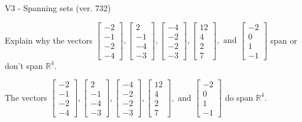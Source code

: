 \begin{exercise}
  \begin{exerciseTitle}V3 - Spanning sets (ver. 732)\end{exerciseTitle}
  \begin{exerciseStatement}
    Explain why the vectors \(\left[\begin{array}{r}
-2 \\
-1 \\
-2 \\
-4
\end{array}\right] , \left[\begin{array}{r}
2 \\
-1 \\
-4 \\
-3
\end{array}\right] , \left[\begin{array}{r}
-4 \\
-2 \\
-2 \\
-3
\end{array}\right] , \left[\begin{array}{r}
12 \\
4 \\
2 \\
7
\end{array}\right] , \text{ and } \left[\begin{array}{r}
-2 \\
0 \\
1 \\
-1
\end{array}\right]\) span or don't span \(\mathbb{R}^4\). 
	


  \end{exerciseStatement}
  \begin{exerciseAnswer}
   The vectors \(\left[\begin{array}{r}
-2 \\
-1 \\
-2 \\
-4
\end{array}\right] , \left[\begin{array}{r}
2 \\
-1 \\
-4 \\
-3
\end{array}\right] , \left[\begin{array}{r}
-4 \\
-2 \\
-2 \\
-3
\end{array}\right] , \left[\begin{array}{r}
12 \\
4 \\
2 \\
7
\end{array}\right] , \text{ and } \left[\begin{array}{r}
-2 \\
0 \\
1 \\
-1
\end{array}\right]\) 
  	 do  
	span \(\mathbb{R}^4\).
  



\end{exerciseAnswer}
\end{exercise}
